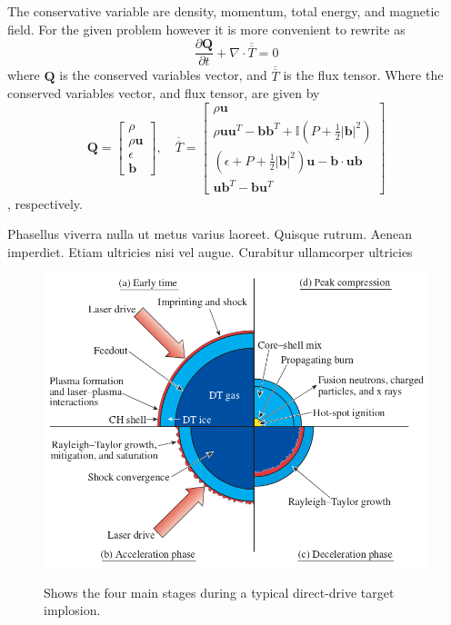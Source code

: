 \documentclass[paper=a4, fontsize=11pt]{scrartcl}
\newcommand*{\rttensor}[1]{\overline{\overline{#1}}}
\newcommand{\pfrac}[2]{\frac{\partial#1}{\partial#2}}
\numberwithin{equation}{section}                %
\numberwithin{figure}{section}                  %
\numberwithin{table}{section}                           %
\begin{document}
The conservative variable are density, momentum, total energy, and magnetic field. For the given problem however it is more convenient to rewrite as
\begin{equation}\label{eqn:mhdvector}
  \pfrac{\mathbf{Q}}{t} + \nabla \cdot \rttensor{T} = 0
\end{equation}
where $\mathbf{Q}$ is the conserved variables vector, and $\rttensor{T}$ is the flux tensor. Where the conserved variables vector, and flux tensor, are given by
\[
  \mathbf{Q}=
  \begin{bmatrix}
    \rho  \\
    \rho \mathbf{u}  \\
    \epsilon\\
    \mathbf{b} 
  \end{bmatrix}
  ,\quad \rttensor{T} =
  \begin{bmatrix}
    \rho \mathbf{u}  \\
    \rho \mathbf{u}\mathbf{u}^T - \mathbf{b}\mathbf{b}^T + \mathbb{I}\left(P + \frac{1}{2}|\mathbf{b}|^2\right)\\
    \left(\epsilon + P + \frac{1}{2}|\mathbf{b}|^2\right)\mathbf{u}- \mathbf{b}\cdot\mathbf{u}\mathbf{b}\\
    \mathbf{u}\mathbf{b}^T-\mathbf{b}\mathbf{u}^T
  \end{bmatrix}
\]
, respectively. 
  
  Phasellus viverra nulla ut metus varius laoreet. Quisque rutrum. Aenean imperdiet. Etiam ultricies nisi vel augue. Curabitur ullamcorper ultricies 


 \begin{figure}[htb]
    \centering
    \includegraphics[width=0.9\linewidth]{fig/DDfusion}\label{fig:ovrvw:dd}
    \caption{Shows the four main stages during a typical direct-drive target implosion.\cite{craxton2015}}
  \end{figure}
\end{document}
